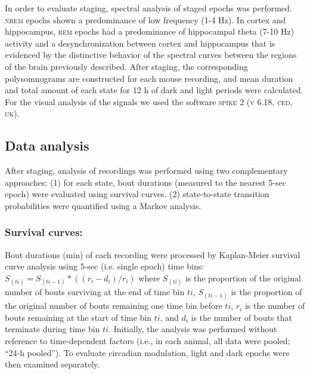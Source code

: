 \documentclass[10pt,letterpaper]{article}
\def\REM/{\textsc{rem}}
\def\NREM/{\textsc{nrem}}
\begin{document}
In order to evaluate  staging, spectral analysis of staged epochs was performed. \NREM/ epochs shown a predominance of low frequency (1-4 Hz). In cortex and hippocampus, \REM/ epochs had a predominance of hippocampal theta (7-10 Hz) activity and a desynchronization between cortex and hippocampus that is evidenced by the distinctive behavior of the spectral curves between the regions of the brain previously described. After staging, the corresponding polysomnograms are constructed for each mouse recording, and mean duration and total amount of each state for 12 h of dark and light periods were calculated. For the visual analysis of the signals we used the software \textsc{spike 2 (v 6.18, ced, uk)}.



\subsection{Data analysis}
 
After staging, analysis of recordings was performed using two complementary approaches: (1) for each state, bout durations (measured to the nearest 5-sec epoch) were evaluated using survival curves. (2) state-to-state transition probabilities were quantified using a Markov analysis.


\subsubsection{Survival curves:} Bout durations (min) of each recording were processed by Kaplan-Meier survival curve analysis using 5-sec (i.e. single epoch) time bins: $S_ {(ti)} = S_{ (ti-1)}*((r_i-d_i)/r_i)$ where $S_ {(ti)}$ is the proportion of the original number of bouts surviving at the end of time bin $ti$, $S_{ (ti-1)}$ is the proportion of the original number of bouts remaining one time bin before $ti$, $r_i$ is the number of bouts remaining at the start of time bin $ti$, and $d_i$ is the number of bouts that terminate during time bin $ti$.  Initially, the analysis was performed without reference to time-dependent factors (i.e., in each animal, all data were pooled; “24-h pooled”). To evaluate circadian modulation, light and dark epochs were then examined separately.
 
\end{document}
